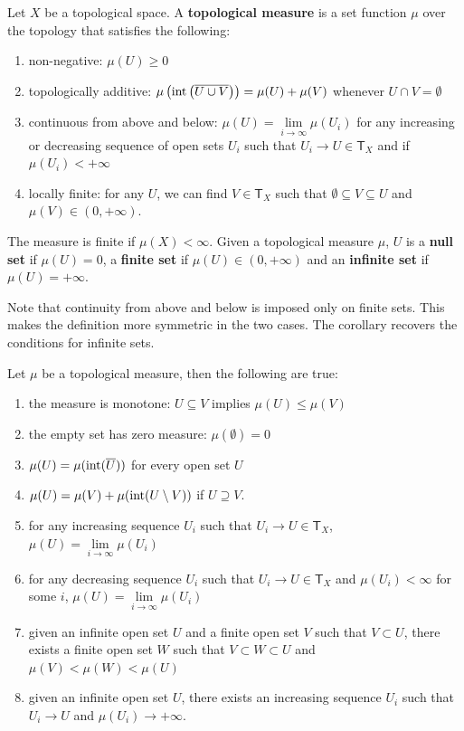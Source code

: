\begin{mathSection}
\begin{defn}
	Let $X$ be a topological space. A \textbf{topological measure} is a set function $\mu$ over the topology that satisfies the following:
	\begin{enumerate}
		\item non-negative: $\mu(U) \geq 0$
		\item topologically additive: $\mu\left(\operatorname{int}\left(\overline{U \cup V}\right)\right) = \mu(U)+\mu(V)$ whenever $U \cap V = \emptyset$
		\item continuous from above and below: $\mu(U) = \lim\limits_{i \to \infty}\mu(U_i)$ for any increasing or decreasing sequence of open sets $U_i$ such that $U_i \to U \in \mathsf{T}_X$ and if $\mu(U_i)<+\infty$
		\item locally finite: for any $U$, we can find $V \in \textsf{T}_X$ such that $\emptyset \subseteq V \subseteq U$ and $\mu(V) \in (0, + \infty)$.
	\end{enumerate}
	The measure is finite if $\mu(X) < \infty$. Given a topological measure $\mu$, $U$ is a \textbf{null set} if $\mu(U) = 0$, a \textbf{finite set} if $\mu(U) \in (0,+\infty)$ and an \textbf{infinite set} if $\mu(U) = +\infty$. 
\end{defn}

\begin{remark}
	Note that continuity from above and below is imposed only on finite sets. This makes the definition more symmetric in the two cases. The corollary recovers the conditions for infinite sets.
\end{remark}

\begin{coro}
	Let $\mu$ be a topological measure, then the following are true:
	\begin{enumerate}
		\item the measure is monotone: $U \subseteq V$ implies $\mu(U) \leq \mu(V)$
		\item the empty set has zero measure: $\mu(\emptyset) = 0$
		\item $\mu(U) = \mu(\operatorname{int}(\overline{U}))$ for every open set $U$
		\item $\mu(U) = \mu(V) + \mu(\operatorname{int}(U \setminus V))$ if  $U \supseteq V$.
		\item for any increasing sequence $U_i$ such that $U_i \to U \in \mathsf{T}_X$, $\mu(U) = \lim\limits_{i \to \infty}\mu(U_i)$
		\item for any decreasing sequence $U_i$ such that $U_i \to U \in \mathsf{T}_X$ and $\mu(U_i) < \infty$ for some $i$, $\mu(U) = \lim\limits_{i \to \infty}\mu(U_i)$
		\item given an infinite open set $U$ and a finite open set $V$ such that $V \subset U$, there exists a finite open set $W$ such that $V \subset W \subset U$ and $\mu(V) < \mu(W) < \mu(U)$
		\item given an infinite open set $U$, there exists an increasing sequence $U_i$ such that $U_i \to U$ and $\mu(U_i) \to +\infty$.
	\end{enumerate}
\end{coro}


\end{mathSection}
